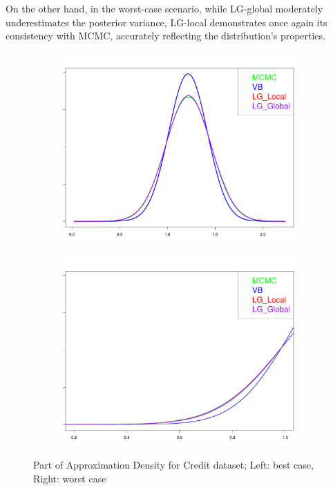 On the other hand, in the worst-case scenario, while LG-global moderately underestimates the posterior variance, LG-local demonstrates once again its consistency with MCMC, accurately reflecting the distribution's properties.

\begin{figure}[h]
	\begin{subfigure}{0.5\textwidth}
		\centering
		\includegraphics[page = 11, width=\linewidth,keepaspectratio]{lasso_densities_Credit.pdf}
	\end{subfigure}
	\begin{subfigure}{0.5\textwidth}
		\includegraphics[page = 2, width=\linewidth,keepaspectratio]{lasso_densities_Credit-1.pdf}
	\end{subfigure}
	\caption{Part of Approximation Density for Credit dataset; Left: best case, Right: worst case}
	\label{fig:Credit}
\end{figure}

